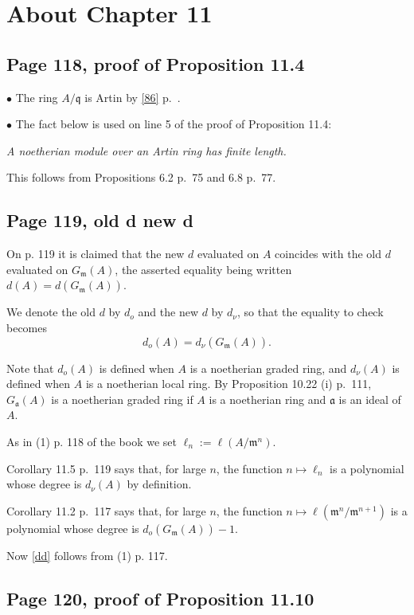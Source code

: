 \documentclass[parskip=half,fontsize=12pt]{scrartcl}%
\newcommand{\mf}{\mathfrak}
\newcommand{\aaa}{\mf a}
\newcommand{\mmm}{\mf m}
\newcommand{\qqq}{\mf q}
\newcommand{\bu}{\bullet}
\begin{document}
\section{About Chapter 11}%

\subsection{Page 118, proof of Proposition 11.4}%

$\bu$ The ring $A/\qqq$ is Artin by \eqref{86} p.~\pageref{86}.

$\bu$ The fact below is used on line 5 of the proof of Proposition 11.4:

\emph{A noetherian module over an Artin ring has finite length.}

This follows from Propositions 6.2 p.~75 and 6.8 p.~77.

\subsection{Page 119, old d new d}\label{odnd}%

On p. 119 it is claimed that the new $d$ evaluated on $A$ coincides with the old $d$ evaluated on $G_\mmm(A)$, the asserted equality being written $d(A)=d(G_\mmm(A))$. 

We denote the old $d$ by $d_o$ and the new $d$ by $d_\nu$, so that the equality to check becomes 
\begin{equation}\label{dd}
d_o(A)=d_\nu(G_\mmm(A)).
\end{equation}

Note that $d_o(A)$ is defined when $A$ is a noetherian graded ring, and $d_\nu(A)$ is defined when $A$ is a noetherian local ring. By Proposition 10.22 (i) p.~111, $G_\aaa(A)$ is a noetherian graded ring if $A$ is a noetherian ring and $\aaa$ is an ideal of $A$.

As in (1) p. 118 of the book we set $\ell_n:=\ell(A/\mmm^n)$. 

Corollary 11.5 p.~119 says that, for large $n$, the function $n\mapsto\ell_n$ is a polynomial whose degree is $d_\nu(A)$ by definition. 

Corollary 11.2 p.~117 says that, for large $n$, the function $n\mapsto\ell(\mmm^n/\mmm^{n+1})$ is a polynomial whose degree is $d_o(G_\mmm(A))-1$.

Now \eqref{dd} follows from (1) p. 117.

\subsection{Page 120, proof of Proposition 11.10}%
\end{document}

